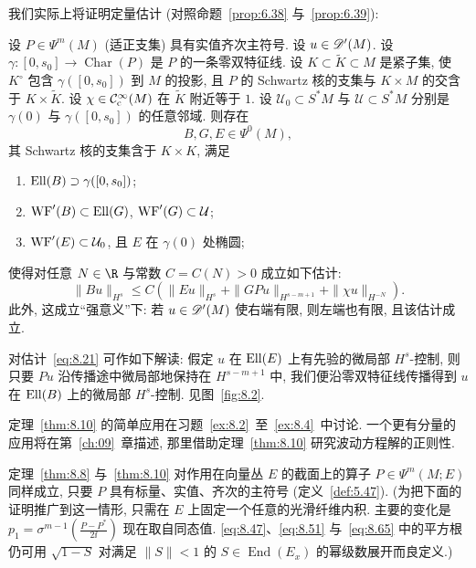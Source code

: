 我们实际上将证明定量估计 (对照命题~\ref{prop:6.38} 与~\ref{prop:6.39}):

\begin{theorem}\label{thm:8.10}
设 $P \in \Psi^m(M)$ (适正支集) 具有实值齐次主符号. 设 $u \in \mathscr{D}'(M)$. 设 $\gamma \colon [0, s_0] \to \operatorname{Char}(P)$ 是 $P$ 的一条零双特征线. 设 $K \subset \tilde{K} \subset M$ 是紧子集, 使 $K^\circ$ 包含 $\gamma([0, s_0])$ 到 $M$ 的投影, 且 $P$ 的 Schwartz 核的支集与 $K \times M$ 的交含于 $K \times \tilde{K}$. 设 $\chi \in \mathcal{C}_{\mathrm{c}}^\infty(M)$ 在 $\tilde{K}$ 附近等于 $1$. 设 $\mathcal{U}_0 \subset S^*M$ 与 $\mathcal{U} \subset S^*M$ 分别是 $\gamma(0)$ 与 $\gamma([0, s_0])$ 的任意邻域. 则存在
\begin{equation}\label{eq:8.20}
    B, G, E \in \Psi^0(M),
\end{equation}
其 Schwartz 核的支集含于 $K \times K$, 满足
\begin{enumerate}
    \item $\operatorname{Ell}(B) \supset \gamma([0, s_0])$;
    \item $\operatorname{WF}'(B) \subset \operatorname{Ell}(G)$, $\operatorname{WF}'(G) \subset \mathcal{U}$;
    \item $\operatorname{WF}'(E) \subset \mathcal{U}_0$, 且 $E$ 在 $\gamma(0)$ 处椭圆;
\end{enumerate}
使得对任意 $N \in \R$ 与常数 $C = C(N) > 0$ 成立如下估计:
\begin{equation}\label{eq:8.21}
    \| B u \|_{H^s} \le C \left( \| E u \|_{H^s} + \| G P u \|_{H^{s-m+1}} + \| \chi u \|_{H^{-N}} \right).
\end{equation}
此外, 这成立``强意义''下: 若 $u \in \mathscr{D}'(M)$ 使右端有限, 则左端也有限, 且该估计成立.
\end{theorem}

对估计~\eqref{eq:8.21} 可作如下解读: 假定 $u$ 在 $\operatorname{Ell}(E)$ 上有先验的微局部 $H^s$-控制, 则只要 $Pu$ 沿传播途中微局部地保持在 $H^{s-m+1}$ 中, 我们便沿零双特征线传播得到 $u$ 在 $\operatorname{Ell}(B)$ 上的微局部 $H^s$-控制. 见图~\ref{fig:8.2}.

定理~\ref{thm:8.10} 的简单应用在习题~\ref{ex:8.2}~至~\ref{ex:8.4}~中讨论. 一个更有分量的应用将在第~\ref{ch:09}~章描述, 那里借助定理~\ref{thm:8.10} 研究波动方程解的正则性.

\begin{remark}[推广到向量丛上的算子]\label{rem:8.11}
定理~\ref{thm:8.8} 与~\ref{thm:8.10} 对作用在向量丛 $E$ 的截面上的算子 $P \in \Psi^m(M; E)$ 同样成立, 只要 $P$ 具有标量、实值、齐次的主符号 (定义~\ref{def:5.47}). (为把下面的证明推广到这一情形, 只需在 $E$ 上固定一个任意的光滑纤维内积. 主要的变化是 $p_1 = \sigma^{m-1}\left( \frac{P - P^*}{2\ii} \right)$ 现在取自同态值. \eqref{eq:8.47}、\eqref{eq:8.51} 与~\eqref{eq:8.65} 中的平方根仍可用 $\sqrt{1 - S}$ 对满足 $\| S \| < 1$ 的 $S \in \operatorname{End}(E_x)$ 的幂级数展开而良定义.)
\end{remark}

